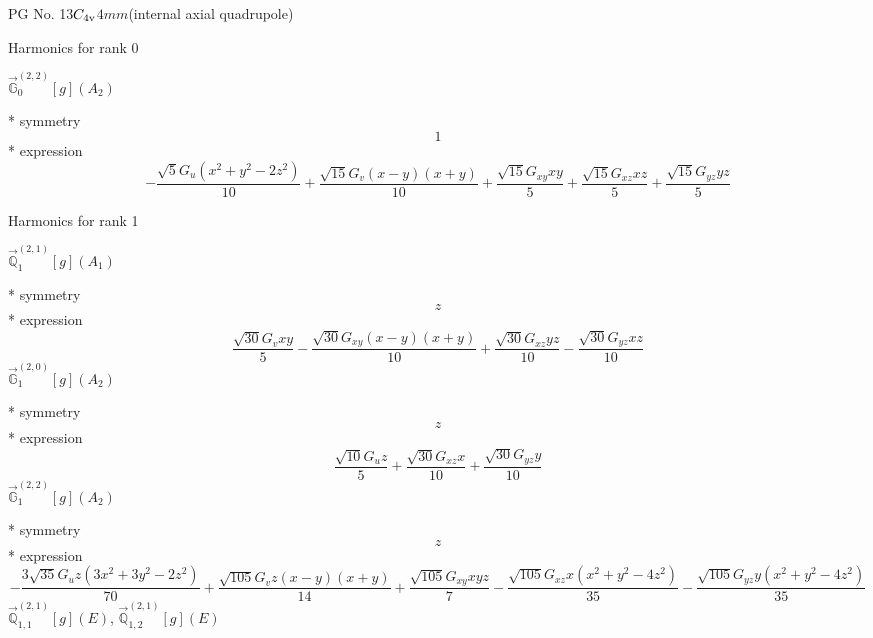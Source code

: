 \documentclass[fleqn,8pt]{jsarticle}
\begin{document}
\setcounter{MaxMatrixCols}{32}

\renewcommand{\tablename}{Table~}
\renewcommand{\figurename}{Figure~}
\begin{center}
\LARGE
PG No. 13\quad$C_{\rm 4v}$\quad$4mm$\quad[ tetragonal ] (internal axial quadrupole)
\end{center}

\noindent * Harmonics for rank 0

\noindent\quad $\vec{\mathbb{G}}_{0}^{(2,2)}[g](A_{2})$

\noindent\quad ** symmetry
\begin{dmath*}
1
\end{dmath*}
\noindent\quad ** expression
\begin{dmath*}
- \frac{\sqrt{5} G_{u} \left(x^{2} + y^{2} - 2 z^{2}\right)}{10} + \frac{\sqrt{15} G_{v} \left(x - y\right) \left(x + y\right)}{10} + \frac{\sqrt{15} G_{xy} x y}{5} + \frac{\sqrt{15} G_{xz} x z}{5} + \frac{\sqrt{15} G_{yz} y z}{5}
\end{dmath*}

\noindent * Harmonics for rank 1

\noindent\quad $\vec{\mathbb{Q}}_{1}^{(2,1)}[g](A_{1})$

\noindent\quad ** symmetry
\begin{dmath*}
z
\end{dmath*}
\noindent\quad ** expression
\begin{dmath*}
\frac{\sqrt{30} G_{v} x y}{5} - \frac{\sqrt{30} G_{xy} \left(x - y\right) \left(x + y\right)}{10} + \frac{\sqrt{30} G_{xz} y z}{10} - \frac{\sqrt{30} G_{yz} x z}{10}
\end{dmath*}
\noindent\quad $\vec{\mathbb{G}}_{1}^{(2,0)}[g](A_{2})$

\noindent\quad ** symmetry
\begin{dmath*}
z
\end{dmath*}
\noindent\quad ** expression
\begin{dmath*}
\frac{\sqrt{10} G_{u} z}{5} + \frac{\sqrt{30} G_{xz} x}{10} + \frac{\sqrt{30} G_{yz} y}{10}
\end{dmath*}
\noindent\quad $\vec{\mathbb{G}}_{1}^{(2,2)}[g](A_{2})$

\noindent\quad ** symmetry
\begin{dmath*}
z
\end{dmath*}
\noindent\quad ** expression
\begin{dmath*}
- \frac{3 \sqrt{35} G_{u} z \left(3 x^{2} + 3 y^{2} - 2 z^{2}\right)}{70} + \frac{\sqrt{105} G_{v} z \left(x - y\right) \left(x + y\right)}{14} + \frac{\sqrt{105} G_{xy} x y z}{7} - \frac{\sqrt{105} G_{xz} x \left(x^{2} + y^{2} - 4 z^{2}\right)}{35} - \frac{\sqrt{105} G_{yz} y \left(x^{2} + y^{2} - 4 z^{2}\right)}{35}
\end{dmath*}
\noindent\quad $\vec{\mathbb{Q}}_{1,1}^{(2,1)}[g](E)$, $\vec{\mathbb{Q}}_{1,2}^{(2,1)}[g](E)$
\end{document}
